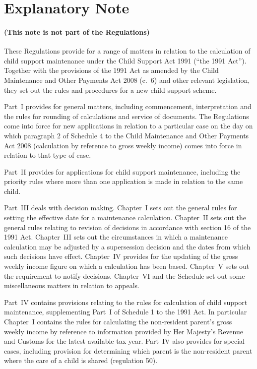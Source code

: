 \documentclass[12pt,a4paper]{article}
\begin{document}
\part{Explanatory Note}

\renewcommand\parthead{— Explanatory Note}

\subsection*{(This note is not part of the Regulations)}

These Regulations provide for a range of matters in relation to the calculation of child support maintenance under the Child Support Act 1991 (“the 1991 Act”). Together with the provisions of the 1991 Act as amended by the Child Maintenance and Other Payments Act 2008 (c.~6) and other relevant legislation, they set out the rules and procedures for a new child support scheme.

Part~I provides for general matters, including commencement, interpretation and the rules for rounding of calculations and service of documents. The Regulations come into force for new applications in relation to a particular case on the day on which paragraph 2 of Schedule 4 to the Child Maintenance and Other Payments Act 2008 (calculation by reference to gross weekly income) comes into force in relation to that type of case.

Part~II provides for applications for child support maintenance, including the priority rules where more than one application is made in relation to the same child.

Part~III deals with decision making. Chapter~I sets out the general rules for setting the effective date for a maintenance calculation. Chapter~II sets out the general rules relating to revision of decisions in accordance with section 16 of the 1991 Act. Chapter~III sets out the circumstances in which a maintenance calculation may be adjusted by a supersession decision and the dates from which such decisions have effect. Chapter~IV provides for the updating of the gross weekly income figure on which a calculation has been based. Chapter~V sets out the requirement to notify decisions. Chapter~VI and the Schedule set out some miscellaneous matters in relation to appeals.

Part~IV contains provisions relating to the rules for calculation of child support maintenance, supplementing Part~I of Schedule 1 to the 1991 Act. In particular Chapter~I contains the rules for calculating the non-resident parent’s gross weekly income by reference to information provided by Her Majesty’s Revenue and Customs for the latest available tax year. Part~IV also provides for special cases, including provision for determining which parent is the non-resident parent where the care of a child is shared (regulation 50).
\end{document}
